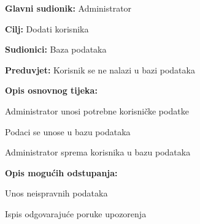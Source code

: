					\noindent {}
					\begin{packed_item}
						
						\item \textbf{Glavni sudionik: }Administrator
						\item  \textbf{Cilj:} Dodati korisnika
						\item  \textbf{Sudionici:} Baza podataka
						\item  \textbf{Preduvjet:} Korisnik se ne nalazi u bazi podataka
						\item  \textbf{Opis osnovnog tijeka:}
						
						\item[] \begin{packed_enum}
							
							\item Administrator unosi potrebne korisničke podatke
							\item Podaci se unose u bazu podataka
							\item Administrator sprema korisnika u bazu podataka
							
						\end{packed_enum}
						
						\item  \textbf{Opis mogućih odstupanja:}
						
						\item[] \begin{packed_item}
							
							\item[1.a] Unos neispravnih podataka
							\item[] \begin{packed_enum}
								
								\item Ispis odgovarajuće poruke upozorenja
								
								
							\end{packed_enum}
							
							
						\end{packed_item}
					\end{packed_item}
				
